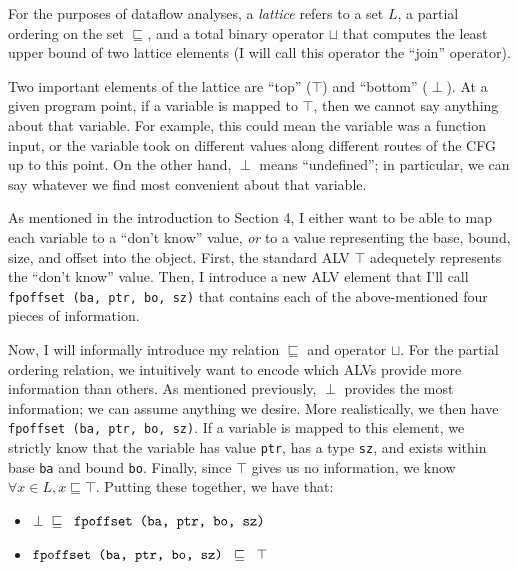 \documentclass{article}
\begin{document}
            For the purposes of dataflow analyses, a \textit{lattice} refers to
            a set $L$, a partial ordering on the set $\sqsubseteq$, and a 
            total binary operator $\sqcup$ that computes the least upper bound of
            two lattice elements (I will call this operator the ``join''
            operator).

            \bigbreak{}

            Two important elements of the lattice are ``top'' ($\top$) and
            ``bottom'' ($\perp$). At a given program point, if a variable is
            mapped to $\top$, then we cannot say anything about that variable.
            For example, this could mean the variable was a function input,
            or the variable took on different values along different routes of
            the CFG up to this point. On the other hand, $\perp$ means ``undefined'';
            in particular, we can say whatever we find most convenient about that
            variable.

            \bigbreak{}

            As mentioned in the introduction to Section 4, I either want to be able to
            map each variable to a ``don't know'' value, \textit{or} to a value representing
            the base, bound, size, and offset into the object. First, the standard ALV
            $\top$ adequetely represents the ``don't know'' value. Then,
            I introduce a new ALV element that I'll call \verb|fpoffset (ba, ptr, bo, sz)| that
            contains each of the above-mentioned four pieces of information. 

            \bigbreak{}
            
            Now, I will informally introduce my relation $\sqsubseteq$ and operator $\sqcup$.
            For the partial ordering relation, we intuitively want to encode which ALVs 
            provide more information than others. As mentioned previously, $\perp$ provides
            the most information; we can assume anything we desire. More realistically, we
            then have \verb|fpoffset (ba, ptr, bo, sz)|. If a variable is mapped to this element,
            we strictly know that the variable has value \verb|ptr|, has a type \verb|sz|,
            and exists within base \verb|ba| and bound \verb|bo|. Finally, since $\top$ gives us
            no information, we know $\forall x \in L, x \sqsubseteq \top$. Putting these together,
            we have that:
            \begin{itemize}
                \item $\perp \;\; \sqsubseteq \;\; \verb|fpoffset (ba, ptr, bo, sz)|$
                \item $\verb|fpoffset (ba, ptr, bo, sz)| \;\; \sqsubseteq \;\; \top$
            \end{itemize}
\end{document}
